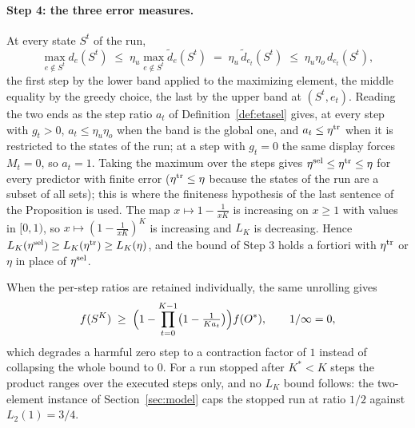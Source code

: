 \paragraph{Step 4: the three error measures.}
At every state $S^{t}$ of the run,
\[
  \max_{e\notin S^{t}}d_{e}(S^{t})
  \;\le\;\eta_u\max_{e\notin S^{t}}\tilde d_{e}(S^{t})
  \;=\;\eta_u\,\tilde d_{e_t}(S^{t})
  \;\le\;\eta_u\eta_o\,d_{e_t}(S^{t}),
\]
the first step by the lower band applied to the maximizing element, the middle
equality by the greedy choice, the last by the upper band at $(S^{t},e_t)$.
Reading the two ends as the step ratio $a_t$ of
Definition~\ref{def:etasel} gives, at every step with $g_t>0$,
$a_t\le\eta_u\eta_o$ when the band is the global one, and
$a_t\le\eta^{\mathrm{tr}}$ when it is restricted to the states of the run; at a step
with $g_t=0$ the same display forces $M_t=0$, so $a_t=1$.  Taking the
maximum over the steps gives $\eta^{\mathrm{sel}}\le\eta^{\mathrm{tr}}\le\eta$ for every
predictor with finite error ($\eta^{\mathrm{tr}}\le\eta$ because the states of the
run are a subset of all sets); this is where the finiteness hypothesis of
the last sentence of the Proposition is used.
The map
$x\mapsto1-\tfrac{1}{xK}$ is increasing on $x\ge1$ with values in $[0,1)$, so
$x\mapsto(1-\tfrac1{xK})^{K}$ is increasing and $L_K$ is decreasing.  Hence
$L_K(\eta^{\mathrm{sel}})\ge L_K(\eta^{\mathrm{tr}})\ge L_K(\eta)$, and the bound of Step 3 holds a
fortiori with $\eta^{\mathrm{tr}}$ or $\eta$ in place of $\eta^{\mathrm{sel}}$.

\begin{remark}\label{rem:app-product}
When the per-step ratios are retained individually, the same unrolling
gives
\[
  f(S^{K})\;\ge\;
  \Bigl(1-\prod_{t=0}^{K-1}\bigl(1-\tfrac1{Ka_t}\bigr)\Bigr)f(O^{\ast}),
  \qquad 1/\infty=0,
\]
which degrades a harmful zero step to a contraction factor of $1$ instead
of collapsing the whole bound to $0$.  For a run stopped after $K^{*}<K$
steps the product ranges over the executed steps only, and no $L_K$ bound
follows: the two-element instance of Section~\ref{sec:model} caps the
stopped run at ratio $1/2$ against $L_2(1)=3/4$.
\end{remark}

